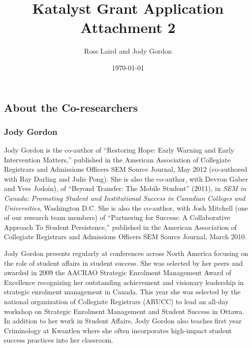 \documentclass[letterpaper,10pt,headsepline]{scrreprt}
\author{Ross Laird and Jody Gordon}
\title{Katalyst Grant Application Attachment 2}
\date{\today}
\begin{document}
\begin{titlingpage}
\begin{center}
\maketitle
\end{center}
\end{titlingpage}
\setcounter{tocdepth}{3}
\tableofcontents

\vspace*{1cm}

\subsection{About the Co-researchers}

  \subsubsection{Jody Gordon}

  Jody Gordon is the co-author of ``Restoring Hope: Early Warning and Early
  Intervention Matters,'' published in the American Association of Collegiate
  Registrars and Admissions Officers SEM Source Journal, May 2012 (co-authored
  with Ray Darling and Julie Pong). She is also the co-author, with Devron
  Gaber and Yves Jodoin), of ``Beyond Transfer: The Mobile Student'' (2011),
  in \emph{SEM in Canada: Promoting Student and Institutional Success in
    Canadian Colleges and Universities}, Washington D.C. She is also the
  co-author, with Josh Mitchell (one of our research team members) of
  ``Partnering for Success: A Collaborative Approach To Student Persistence,''
  published in the American Association of Collegiate Registrars and
  Admissions Officers SEM Source Journal, March 2010.

  Jody Gordon presents regularly at conferences across North America focusing
  on the role of student affairs in student success. She was selected by her
  peers and awarded in 2009 the AACRAO Strategic Enrolment Management Award of
  Excellence recognizing her outstanding achievement and visionary leadership
  in strategic enrolment management in Canada. This year she was selected by
  the national organization of Collegiate Registrars (ARUCC) to lead an
  all-day workshop on Strategic Enrolment Management and Student Success in
  Ottawa. In addition to her work in Student Affairs, Jody Gordon also
  teaches first year Criminology at Kwantlen where she often incorporates
  high-impact student success practices into her classroom.
\end{document}

